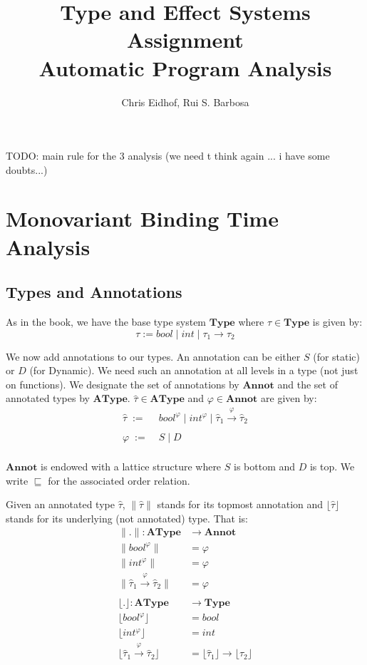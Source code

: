 \documentclass[a4wide,12pt]{article}
\theoremstyle{definition}
\theoremstyle{plain}
\theoremstyle{remark}
\def\Type {\mathbf{Type}}
\def\AType{\mathbf{AType}}
\def\Annot{\mathbf{Annot}}
\def\sqleq{\sqsubseteq}
\def\htau{\hat{\tau}}
\def\annot#1{\|#1\|}
\def\baset#1{\lfloor#1\rfloor}
\begin{document}
\author{Chris Eidhof, Rui S. Barbosa}
\title{Type and Effect Systems Assignment \\ Automatic Program Analysis}
 
\maketitle

TODO: main rule for the 3 analysis 
(we need t think again ... i have some doubts...)

\section{Monovariant Binding Time Analysis}

\subsection{Types and Annotations}
As in the book, we have the base type system $\Type$ where $\tau \in \Type$ is given by:
\[\tau := bool\; |\; int\; | \;\tau_1 \to \tau_2\]

We  now add annotations to our types. An annotation can be either $S$ (for static) or $D$ (for Dynamic). 
We need such an annotation
at all levels in a type (not just on functions). We designate the set of annotations by $\Annot$ and
the set of annotated types by
$\AType$. $\htau \in \AType$ and $\varphi \in \Annot$ are given by:
\begin{align*}
\htau  \; := \; & bool^\varphi \mid int^\varphi \mid \htau_1 \overset{\varphi}{\to} \htau_2 \\
& \\
\varphi \; := \; & S \mid D\\
\end{align*}

$\Annot$ is endowed with a lattice structure where $S$ is bottom and  $D$ is top. We write $\sqleq$ for
the associated order relation. 

Given an annotated type $\htau$, $\annot{\htau}$ stands for its topmost annotation
and $\baset{\htau}$ stands for its underlying (not annotated) type. That is:
\begin{align*}
 \annot{.} : \AType &\to \Annot\\
 \annot{bool^\varphi} & = \varphi \\
 \annot{int^\varphi} & = \varphi \\
 \annot{\htau_1 \overset{\varphi}{\to} \htau_2} & = \varphi \\
\\
\baset{.}  : \AType &\to \Type\\
\baset{bool^\varphi} & = bool \\
\baset{int^\varphi} & = int \\
\baset{\htau_1 \overset{\varphi}{\to} \htau_2} & = \baset{\htau_1} \to \baset{\htau_2} \\
\end{align*}
\end{document}
